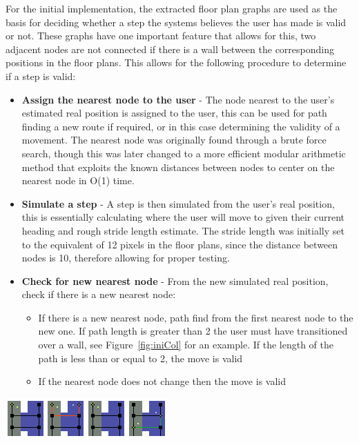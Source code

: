 \documentclass[12pt,a4paper]{report}
\begin{document}
For the initial implementation, the extracted floor plan graphs are used as the basis for deciding whether a step the systems believes the user has made is valid or not. These graphs have one important feature that allows for this, two adjacent nodes are not connected if there is a wall between the corresponding positions in the floor plans. This allows for the following procedure to determine if a step is valid:

\begin{itemize}
	\item \textbf{Assign the nearest node to the user} - The node nearest to the user's estimated real position is assigned to the user, this can be used for path finding a new route if required, or in this case determining the validity of a movement. The nearest node was originally found through a brute force search, though this was later changed to a more efficient modular arithmetic method that exploits the known distances between nodes to center on the nearest node in O(1) time.
	\item \textbf{Simulate a step} - A step is then simulated from the user's real position, this is essentially calculating where the user will move to given their current heading and rough stride length estimate. The stride length was initially set to the equivalent of 12 pixels in the floor plans, since the distance between nodes is 10, therefore allowing for proper testing. 
	\item \textbf{Check for new nearest node} - From the new simulated real position, check if there is a new nearest node:
	\begin{itemize}
		\item If there is a new nearest node, path find from the first nearest node to the new one. If path length is greater than 2 the user must have transitioned over a wall, see Figure~\ref{fig:iniCol} for an example. If the length of the path is less than or equal to 2, the move is valid
		\item If the nearest node does not change then the move is valid
	\end{itemize}
\end{itemize}

\begin{center}
\includegraphics[scale=1.5]{images-implementation/collision1.png}
\label{fig:iniCol}
\end{center}
\end{document}
